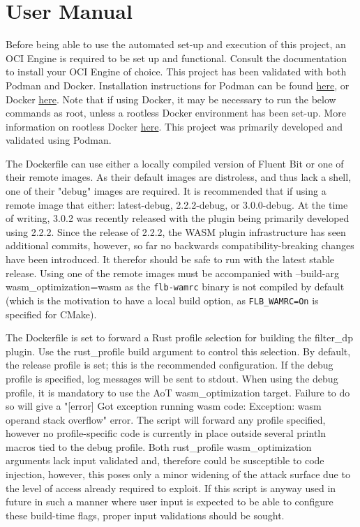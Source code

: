 \chapter{User Manual\label{chap:user_man}}

Before being able to use the automated set-up and execution of this project, an OCI Engine is required to be set up and functional. Consult the documentation to install your OCI Engine of choice. This project has been validated with both Podman and Docker. Installation instructions for Podman can be found \href{https://podman.io/docs/installation}{here},  or Docker \href{https://docs.docker.com/get-docker/}{here}. Note that if using Docker, it may be necessary to run the below commands as root, unless a rootless Docker environment has been set-up. More information on rootless Docker \href{https://docs.docker.com/engine/security/rootless/}{here}. This project was primarily developed and validated using Podman.

The Dockerfile can use either a locally compiled version of Fluent Bit or one of their remote images. As their default images are distroless, and thus lack a shell, one of their "debug" images are required. It is recommended that if using a remote image that either: latest-debug, 2.2.2-debug, or 3.0.0-debug. At the time of writing, 3.0.2 was recently released with the plugin being primarily developed using 2.2.2. Since the release of 2.2.2, the WASM plugin infrastructure has seen additional commits, however, so far no backwards compatibility-breaking changes have been introduced. It therefor should be safe to run with the latest stable release. Using one of the remote images must be accompanied with --build-arg wasm\_optimization=wasm as the \texttt{flb-wamrc} binary is not compiled by default (which is the motivation to have a local build option, as \texttt{FLB\_WAMRC=On} is specified for CMake). 

The Dockerfile is set to forward a Rust profile selection for building the filter\_dp plugin. Use the rust\_profile build argument to control this selection. By default, the release profile is set; this is the recommended configuration. If the debug profile is specified, log messages will be sent to stdout. When using the debug profile, it is mandatory to use the AoT wasm\_optimization target. Failure to do so will give a "[error] Got exception running wasm code: Exception: wasm operand stack overflow" error. The script will forward any profile specified, however no profile-specific code is currently in place outside several println macros tied to the debug profile. Both rust\_profile wasm\_optimization arguments lack input validated and, therefore could be susceptible to code injection, however, this poses only a minor widening of the attack surface due to the level of access already required to exploit. If this script is anyway used in future in such a manner where user input is expected to be able to configure these build-time flags, proper input validations should be sought. 

